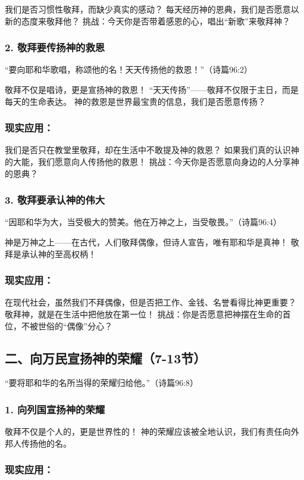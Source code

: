 \documentclass[a4paper, 12pt]{article}
\begin{document}
我们是否习惯性敬拜，而缺少真实的感动？
每天经历神的恩典，我们是否愿意以新的态度来敬拜他？
挑战：今天你是否带着感恩的心，唱出“新歌”来敬拜神？

\subsubsection*{2. 敬拜要传扬神的救恩}
“要向耶和华歌唱，称颂他的名！天天传扬他的救恩！”（诗篇96:2）

敬拜不仅是唱诗，更是宣扬神的救恩！
“天天传扬”——敬拜不仅限于主日，而是每天的生命表达。
神的救恩是世界最宝贵的信息，我们是否愿意传扬？
\subsubsection*{现实应用：}

我们是否只在教堂里敬拜，却在生活中不敢提及神的救恩？
如果我们真的认识神的大能，我们愿意向人传扬他的救恩！
挑战：今天你是否愿意向身边的人分享神的恩典？

\subsubsection*{3. 敬拜要承认神的伟大}
“因耶和华为大，当受极大的赞美。他在万神之上，当受敬畏。”（诗篇96:4）

神是万神之上——在古代，人们敬拜偶像，但诗人宣告，唯有耶和华是真神！
敬拜是承认神的至高权柄！
\subsubsection*{现实应用：}

在现代社会，虽然我们不拜偶像，但是否把工作、金钱、名誉看得比神更重要？
敬拜神，就是在生活中把他放在第一位！
挑战：你是否愿意把神摆在生命的首位，不被世俗的“偶像”分心？

\subsection*{二、向万民宣扬神的荣耀（7-13节）}
“要将耶和华的名所当得的荣耀归给他。”（诗篇96:8）

\subsubsection*{1. 向列国宣扬神的荣耀}
敬拜不仅是个人的，更是世界性的！
神的荣耀应该被全地认识，我们有责任向外邦人传扬他的名。
\subsubsection*{现实应用：}
\end{document}
